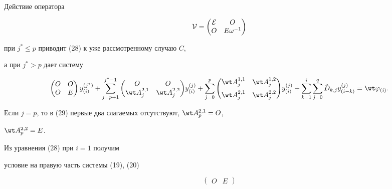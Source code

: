 \begin{pf}
Действие оператора


$$


\cal V=\begin{pmatrix} \cal E & O\\ O & E \omega^{-1} \end{pmatrix}


$$


при $j^* \le p$ приводит (28) к уже рассмотренному случаю $C$,


а при $j^* >p$ дает систему 


\begin{equation}


\begin{pmatrix}  O & O\\  O & E \end{pmatrix}


y_{(i)}^{(j^*)}+\sum_{j=p+1}^{j^*-1}{{\begin{pmatrix}


 O & O \\ \wt A_j^{2,1} & \wt A_j^{2,2} 


\end{pmatrix}}


y_{(i)}^{(j)}}+\sum_{j=0}^{p}{{\begin{pmatrix}


 \wt A_j^{1,1} & \wt A_j^{1,2} \\[2mm]


 \wt A_j^{2,1} & \wt A_j^{2,2} 


\end{pmatrix}}


y_{(i)}^{(j)}}+\sum_{k=1}^{i}{\sum_{j=0}^{q}{ \check D_{k,j} 


y_{(i-k)}^{(j)}}}= \wt \varphi_{(i)}.


\end{equation}


Если $j=p$, то в (29) первые два слагаемых отсутствуют, $\wt A_p^{2,1}=O$, 


$\wt A_p^{2,2}=E$.





Из уравнения (28) при $i=1$ получим 


условие на правую часть системы (19), (20)


\begin{equation}


\begin{pmatrix}  O & E \end{pmatrix}



\end{equation}
\end{pf}
